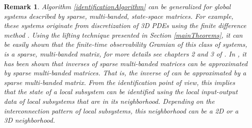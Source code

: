 \documentclass[journal,10pt]{IEEEtran}
\newtheorem{rem}[thm]{Remark}
\begin{document}
\begin{rem}
Algorithm \ref{identificationAlgorithm} can be generalized for global systems described by sparse, multi-banded, state-space matrices. For example, these systems originate from discretization of 3D PDEs using the finite difference method \cite{haberThesis}. Using the lifting technique presented in Section  \ref{mainTheorems}, it can be easily shown that the finite-time observability Gramian   of this class of systems, is a sparse, multi-banded matrix, for more details see chapters 2 and 3 of \cite{haberThesis}. In \cite{grote1997,benzi2007,haberThesis}, it has been shown that inverses  of sparse multi-banded matrices can be approximated by sparse multi-banded matrices. That is, the inverse of  can be approximated by a sparse multi-banded matrix. From the identification point of view, this implies that the state of a local subsystem can be identified using the local input-output data of local subsystems that are in its neighborhood. Depending on the interconnection pattern of local subsystems, this neighborhood can be a 2D or a 3D neighborhood. 
\label{remarkGeneralization}
\end{rem}
\end{document}
